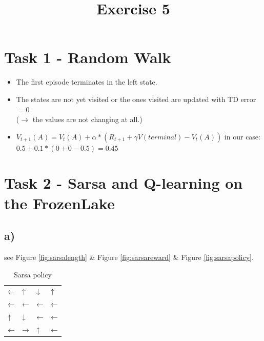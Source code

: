 \documentclass[a4paper]{article}
\date{}
\author{}
\title{\textbf{Exercise 5}}
\begin{document}
\maketitle 
\thispagestyle{fancy}

\section*{Task 1 - Random Walk}
\begin{itemize}
	\item The first episode terminates in the left state.
	\item The states are not yet visited or the ones visited are updated with TD error $ = 0 $\\
	($ \rightarrow $ the values are not changing at all.)
	\item $ V_{t+1}(A) = V_t(A) + \alpha * (R_{t+1} + \gamma V(terminal) - V_t(A)) $ in our case: $ 0.5 + 0.1 * (0 + 0 - 0.5) = 0.45 $
\end{itemize}


\section*{Task 2 - Sarsa and Q-learning on the FrozenLake}

\subsection*{a)}
see Figure \ref{fig:sarsalength} \& Figure \ref{fig:sarsareward} \& Figure \ref{fig:sarsapolicy}.

\begin{table}[!ht]
	\centering
	\begin{tabular}{llll}
		← & ↑ & ↓ & ↑ \\
		← & ← & ← & ← \\
		↑ & ↓ & ← & ← \\
		← & → & ↑ & ←
	\end{tabular}
	\caption{Sarsa policy}
\end{table}
\end{document}
